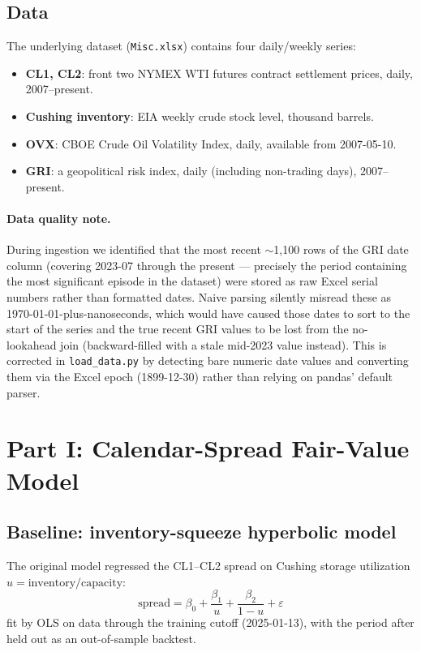 \documentclass[11pt]{article}
\begin{document}
\subsection{Data}
The underlying dataset (\texttt{Misc.xlsx}) contains four daily/weekly
series:

\begin{itemize}
  \item \textbf{CL1, CL2}: front two NYMEX WTI futures contract settlement
  prices, daily, 2007--present.
  \item \textbf{Cushing inventory}: EIA weekly crude stock level, thousand
  barrels.
  \item \textbf{OVX}: CBOE Crude Oil Volatility Index, daily, available
  from 2007-05-10.
  \item \textbf{GRI}: a geopolitical risk index, daily (including
  non-trading days), 2007--present.
\end{itemize}

\paragraph{Data quality note.} During ingestion we identified that the most
recent $\sim$1{,}100 rows of the GRI date column (covering 2023-07 through
the present --- precisely the period containing the most significant
episode in the dataset) were stored as raw Excel serial numbers rather than
formatted dates. Naive parsing silently misread these as
1970-01-01-plus-nanoseconds, which would have caused those dates to sort to
the start of the series and the true recent GRI values to be lost from the
no-lookahead join (backward-filled with a stale mid-2023 value instead).
This is corrected in \texttt{load\_data.py} by detecting bare numeric date
values and converting them via the Excel epoch (1899-12-30) rather than
relying on pandas' default parser.

\section{Part I: Calendar-Spread Fair-Value Model}

\subsection{Baseline: inventory-squeeze hyperbolic model}
The original model regressed the CL1--CL2 spread on Cushing storage
utilization $u = \text{inventory} / \text{capacity}$:
\[
\text{spread} = \beta_0 + \frac{\beta_1}{u} + \frac{\beta_2}{1-u} + \varepsilon
\]
fit by OLS on data through the training cutoff (2025-01-13), with the
period after held out as an out-of-sample backtest.
\end{document}

